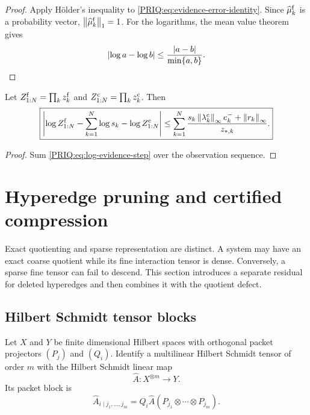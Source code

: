 \begin{proof}
Apply Hölder's inequality to \eqref{PRIQ:eq:evidence-error-identity}.  Since $\widehat\mu_k^{\mathrm f}$ is a probability vector, $\left\lVert \widehat\mu_k^{\mathrm f}\right\rVert_1=1$.  For the logarithms, the mean value theorem gives
\[
  \left\lvert \log a-\log b\right\rvert
  \leq\frac{\left\lvert a-b\right\rvert}{\min\{a,b\}}.
\]
\end{proof}

\begin{PRIQcorollary}\label{PRIQ:cor:cumulative-evidence}
Let $Z_{1:N}^{\mathrm f}=\prod_kz_k^{\mathrm f}$ and $Z_{1:N}^{\mathrm c}=\prod_kz_k^{\mathrm c}$.  Then
\begin{equation}\label{PRIQ:eq:cumulative-evidence}
  \boxed{
  \left\lvert 
  \log Z_{1:N}^{\mathrm f}
  -\sum_{k=1}^N\log s_k
  -\log Z_{1:N}^{\mathrm c}\right\rvert
  \leq
  \sum_{k=1}^N
  \frac{
  s_k\left\lVert \lambda_k^{\mathrm c}\right\rVert_{\infty}e_k^-
  +\left\lVert r_k\right\rVert_{\infty}
  }{z_{*,k}}.}
\end{equation}
\end{PRIQcorollary}

\begin{proof}
Sum \eqref{PRIQ:eq:log-evidence-step} over the observation sequence.
\end{proof}

\section{Hyperedge pruning and certified compression}\label{PRIQ:sec:pruning}

Exact quotienting and sparse representation are distinct.  A system may have an exact coarse quotient while its fine interaction tensor is dense.  Conversely, a sparse fine tensor can fail to descend.  This section introduces a separate residual for deleted hyperedges and then combines it with the quotient defect.

\subsection{Hilbert Schmidt tensor blocks}
Let $X$ and $Y$ be finite dimensional Hilbert spaces with orthogonal packet projectors $(P_j)$ and $(Q_i)$.  Identify a multilinear Hilbert Schmidt tensor of order $m$ with the Hilbert Schmidt linear map
\[
  \widehat A:X^{\otimes m}\to Y.
\]
Its packet block is
\[
  \widehat A_{i\mid j_1,\ldots,j_m}
  =
  Q_i\widehat A(P_{j_1}\otimes\cdots\otimes P_{j_m}).
\]

